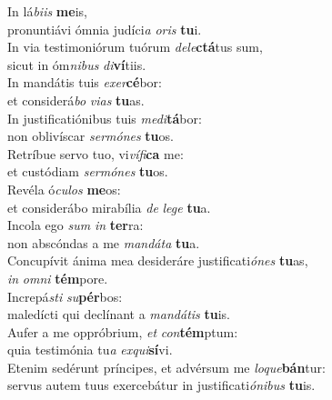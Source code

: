 \oddverse In lá\textit{bi}\textit{is} \textbf{me}is,~\*\\
\oddverse pronuntiávi ómnia judíci\textit{a} \textit{o}\textit{ris} \textbf{tu}i.\\
\evenverse In via testimoniórum tuórum \textit{de}\textit{le}\textbf{ctá}tus sum,~\*\\
\evenverse sicut in óm\textit{ni}\textit{bus} \textit{di}\textbf{ví}tiis.\\
\oddverse In mandátis tuis \textit{e}\textit{xer}\textbf{cé}bor:~\*\\
\oddverse et considerá\textit{bo} \textit{vi}\textit{as} \textbf{tu}as.\\
\evenverse In justificatiónibus tuis \textit{me}\textit{di}\textbf{tá}bor:~\*\\
\evenverse non oblivíscar \textit{ser}\textit{mó}\textit{nes} \textbf{tu}os.\\
\oddverse Retríbue servo tuo, vi\textit{ví}\textit{fi}\textbf{ca} me:~\*\\
\oddverse et custódiam \textit{ser}\textit{mó}\textit{nes} \textbf{tu}os.\\
\evenverse Revéla ó\textit{cu}\textit{los} \textbf{me}os:~\*\\
\evenverse et considerábo mirabília \textit{de} \textit{le}\textit{ge} \textbf{tu}a.\\
\oddverse Incola ego \textit{sum} \textit{in} \textbf{ter}ra:~\*\\
\oddverse non abscóndas a me \textit{man}\textit{dá}\textit{ta} \textbf{tu}a.\\
\evenverse Concupívit ánima mea desideráre justificati\textit{ó}\textit{nes} \textbf{tu}as,~\*\\
\evenverse \textit{in} \textit{om}\textit{ni} \textbf{tém}pore.\\
\oddverse Increpá\textit{sti} \textit{su}\textbf{pér}bos:~\*\\
\oddverse maledícti qui declínant a \textit{man}\textit{dá}\textit{tis} \textbf{tu}is.\\
\evenverse Aufer a me oppróbrium, \textit{et} \textit{con}\textbf{tém}ptum:~\*\\
\evenverse quia testimónia tu\textit{a} \textit{ex}\textit{qui}\textbf{sí}vi.\\
\oddverse Etenim sedérunt príncipes, et advérsum me \textit{lo}\textit{que}\textbf{bán}tur:~\*\\
\oddverse servus autem tuus exercebátur in justificati\textit{ó}\textit{ni}\textit{bus} \textbf{tu}is.\\
